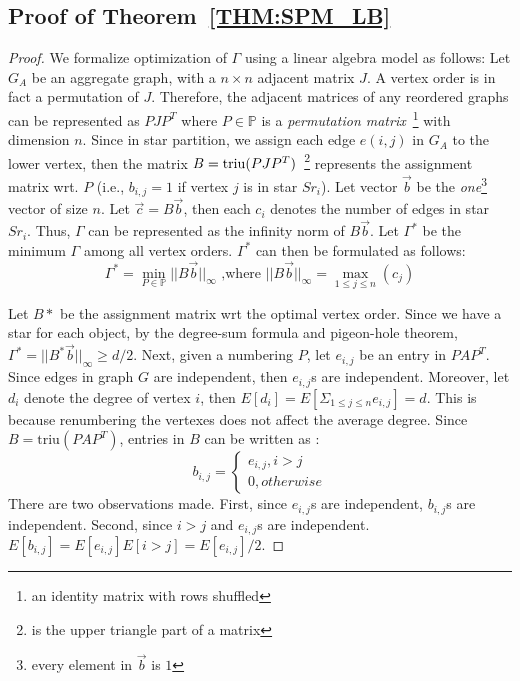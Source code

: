\subsection{Proof of Theorem~\ref{THM:SPM_LB}}
\begin{proof}
We formalize optimization of $\Gamma$ using a linear algebra model as follows:  
Let $G_A$ be an aggregate graph, with a $n \times n$ adjacent matrix $J$.
A vertex order is in fact a permutation of $J$. Therefore,
the adjacent matrices of any reordered graphs can be represented as $PJP^T$
where $P \in \mathbb{P}$ is a 
\emph{permutation matrix}~\footnote{an identity matrix with rows shuffled} with dimension $n$.
Since in star partition, we assign each edge $e(i,j)$ in $G_A$ to the lower vertex, 
then the matrix $B=\operatorname*{triu}(PJP^T)$~\footnote{ is the upper triangle part of a matrix}
represents the assignment matrix wrt. $P$ (i.e., $b_{i,j} = 1$ if vertex $j$ is in star $Sr_i$).
Let vector $\vec{b}$ be the \textit{one}\footnote{every element in $\vec{b}$ is $1$} 
vector of size $n$. Let $\vec{c} = B\vec{b}$, then each $c_i$ 
denotes the number of edges in star $Sr_i$. Thus, $\Gamma$ can be represented
as the infinity norm of $B\vec{b}$. Let $\Gamma^*$ be the minimum $\Gamma$ among all vertex orders. 
$\Gamma^*$ can then be formulated as follows:
\begin{equation}
\Gamma^* = \min_{P \in \mathbb{P}}{||B\vec{b}||_\infty} \text{ ,where } ||B\vec{b}||_\infty = \max_{1\leq j \leq n}(c_j)
\end{equation}

Let $B*$ be the assignment matrix wrt the optimal vertex order.
Since we have a star for each object, by the degree-sum formula and pigeon-hole theorem, 
$\Gamma^*=||B^*\vec{b}||_\infty \geq d/2$.
Next, given a numbering $P$, let $e_{i,j}$ be an entry in $PAP^T$. Since 
edges in graph $G$ are independent, then $e_{i,j}$s are independent. Moreover,
let $d_i$ denote the degree of vertex $i$, 
then $E[d_i]=E[\Sigma_{1\leq j \leq n}e_{i,j}]=d$. This is because renumbering the
vertexes does not affect the average degree.
Since $B=\text{triu}(PAP^T)$, entries in $B$ can be written as :
\begin{equation*}
b_{i,j} = \begin{cases}
			e_{i,j}, i>j \\
			0, otherwise
		  \end{cases}  
\end{equation*}
There are two observations made. First, since $e_{i,j}$s are independent,
$b_{i,j}$s are independent. Second, since $i>j$ and $e_{i,j}$s are independent. 
$E[b_{i,j}] = E[e_{i,j}]E[i>j]= E[e_{i,j}]/2$.


\end{proof}

